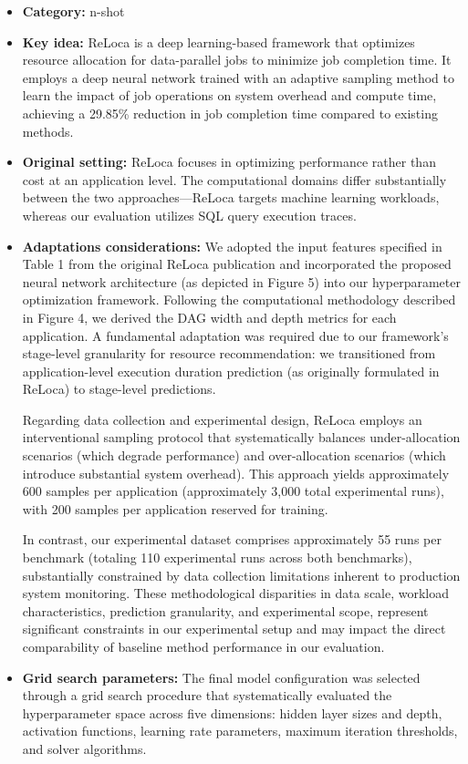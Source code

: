 \begin{itemize}
    \item \textbf{Category:} n-shot
    \item \textbf{Key idea:} ReLoca is a deep learning-based framework that optimizes resource allocation for data-parallel jobs to minimize job completion time. It employs a deep neural network trained with an adaptive sampling method to learn the impact of job operations on system overhead and compute time, achieving a 29.85\% reduction in job completion time compared to existing methods.
    \item \textbf{Original setting:} ReLoca focuses in optimizing performance rather than cost at an application level. The computational domains differ substantially between the two approaches---ReLoca targets machine learning workloads, whereas our evaluation utilizes SQL query execution traces.
    \item \textbf{Adaptations considerations:} We adopted the input features specified in Table 1 from the original ReLoca publication and incorporated the proposed neural network architecture (as depicted in Figure 5) into our hyperparameter optimization framework. Following the computational methodology described in Figure 4, we derived the DAG width and depth metrics for each application. A fundamental adaptation was required due to our framework's stage-level granularity for resource recommendation: we transitioned from application-level execution duration prediction (as originally formulated in ReLoca) to stage-level predictions.
    
    Regarding data collection and experimental design, ReLoca employs an interventional sampling protocol that systematically balances under-allocation scenarios (which degrade performance) and over-allocation scenarios (which introduce substantial system overhead). This approach yields approximately 600 samples per application (approximately 3,000 total experimental runs), with 200 samples per application reserved for training.
    
    In contrast, our experimental dataset comprises approximately 55 runs per benchmark (totaling 110 experimental runs across both benchmarks), substantially constrained by data collection limitations inherent to production system monitoring. These methodological disparities in data scale, workload characteristics, prediction granularity, and experimental scope, represent significant constraints in our experimental setup and may impact the direct comparability of baseline method performance in our evaluation.
    \item \textbf{Grid search parameters:} The final model configuration was selected through a grid search procedure that systematically evaluated the hyperparameter space across five dimensions: hidden layer sizes and depth, activation functions, learning rate parameters, maximum iteration thresholds, and solver algorithms.
\end{itemize}

